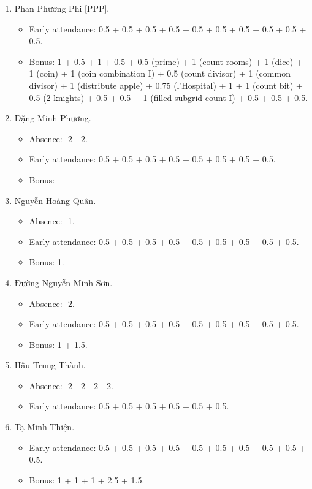 \documentclass{article}
\begin{document}
\begin{enumerate}
\begin{itemize}
	\end{itemize}
	\item {\sc Phan Phương Phi [PPP].}
	\begin{itemize}
		\item Early attendance: 0.5 + 0.5 + 0.5 + 0.5 + 0.5 + 0.5 + 0.5 + 0.5 + 0.5 + 0.5.
		\item Bonus: 1 + 0.5 + 1 + 0.5 + 0.5 (prime) + 1 (count rooms) + 1 (dice) + 1 (coin) + 1 (coin combination I) + 0.5 (count divisor) + 1 (common divisor) + 1 (distribute apple) + 0.75 (l'Hospital) + 1 + 1 (count bit) + 0.5 (2 knights) + 0.5 + 0.5 + 1 (filled subgrid count I) + 0.5 + 0.5 + 0.5.
	\end{itemize}
	\item {\sc Đặng Minh Phương.}
	\begin{itemize}
        \item Absence: -2 - 2.
		\item Early attendance: 0.5 + 0.5 + 0.5 + 0.5 + 0.5 + 0.5 + 0.5 + 0.5.
		\item Bonus:
	\end{itemize}
	\item {\sc Nguyễn Hoàng Quân.}
	\begin{itemize}
        \item Absence: -1.
		\item Early attendance: 0.5 + 0.5 + 0.5 + 0.5 + 0.5 + 0.5 + 0.5 + 0.5 + 0.5.
		\item Bonus: 1.
	\end{itemize}
	\item {\sc Đường Nguyễn Minh Sơn.}
	\begin{itemize}
        \item Absence: -2.
		\item Early attendance: 0.5 + 0.5 + 0.5 + 0.5 + 0.5 + 0.5 + 0.5 + 0.5 + 0.5.
		\item Bonus: 1 + 1.5.
	\end{itemize}
	\item {\sc Hấu Trung Thành.}
	\begin{itemize}
		\item Absence: -2 - 2 - 2 - 2.
		\item Early attendance: 0.5 + 0.5 + 0.5 + 0.5 + 0.5 + 0.5.
	\end{itemize}
	\item {\sc Tạ Minh Thiện.}
	\begin{itemize}
		\item Early attendance: 0.5 + 0.5 + 0.5 + 0.5 + 0.5 + 0.5 + 0.5 + 0.5 + 0.5 + 0.5.
		\item Bonus: 1 + 1 + 1 + 2.5 + 1.5.

\end{itemize}
\end{enumerate}
\end{document}
